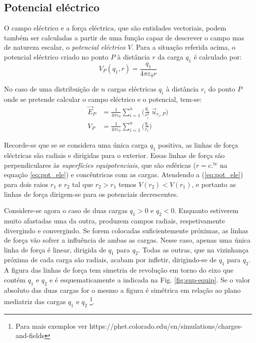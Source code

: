 \documentclass[a4paper,twoside,11pt]{report}      %
\begin{document}
\subsection{\sf Potencial eléctrico}
	
O campo eléctrico e a força eléctrica, que são entidades vectoriais, podem também ser calculadas a partir de uma função capaz de descrever o campo mas de natureza escalar, o \emph{potencial eléctrico} $V$. Para a situação referida acima, o potencial eléctrico criado no ponto $P$ à distância $r$ da carga $q_1$ é calculado por:
\begin{equation} \label{eq:pot_ele}
	V_P (q_1, r) = \frac{q_1}{4 \pi \varepsilon_0 r} 
\end{equation}


No caso de uma distribuição de $n$ cargas eléctricas $q_i$ à distância $r_i$ do ponto $P$ onde se pretende calcular o campo eléctrico e o potencial, tem-se:
\begin{align}
	\vec{E}_P &= \frac{1}{4 \pi \varepsilon_0 } \sum_{i=1}^n \Big( \frac{q_i}{ r_i^2}\; \vec{u}_{r_i , P}  \Big) \nonumber \\ 
 V_P &= \frac{1}{4 \pi \varepsilon_0 } \sum_{i=1}^n \Big( \frac{q_i}{ r_i}  \Big) \nonumber
\end{align}

Recorde-se que se se considera uma única carga $q_1$ positiva, as linhas de força eléctricas são radiais e dirigidas para o exterior. Essas linhas de força são perpendiculares às \emph{superfícies equipotenciais}, que são esféricas ($r = \mathrm{c.^{te}}$ na equação \ref{eq:pot_ele}) e concêntricas com as cargas. Atendendo a (\ref{eq:pot_ele}) para dois raios $r_1$ e $r_2$ tal que $r_2 > r_1$ temos $V(r_2) < V(r_1)$, e portanto as linhas de força dirigem-se para os potenciais decrescentes.

Considere-se agora o caso de duas cargas $q_1 > 0$ e $q_2 < 0$. Enquanto estiverem muito afastadas uma da outra, produzem campos radiais, respetivamente divergindo e convergindo. Se forem colocadas suficientemente próximas, as linhas de força vão sofrer a influência de ambas as cargas. Nesse caso, apenas uma única linha de força é linear, dirigida de $q_1$ para $q_2$. Todas as outras, que na vizinhança próxima de cada carga são radiais, acabam por infletir, dirigindo-se de $q_1$ para $q_2$. A figura das linhas de força tem simetria de revolução em torno do eixo que contém $q_1$ e $q_2$ e é esquematicamente a indicada na Fig. \ref{fig:sup-equip}. Se o valor absoluto das duas cargas for o mesmo a figura é simétrica em relação ao plano mediatriz das cargas $q_1$ e $q_2$ \footnote{Para mais exemplos ver https://phet.colorado.edu/en/simulations/charges-and-fields}.
\end{document}
